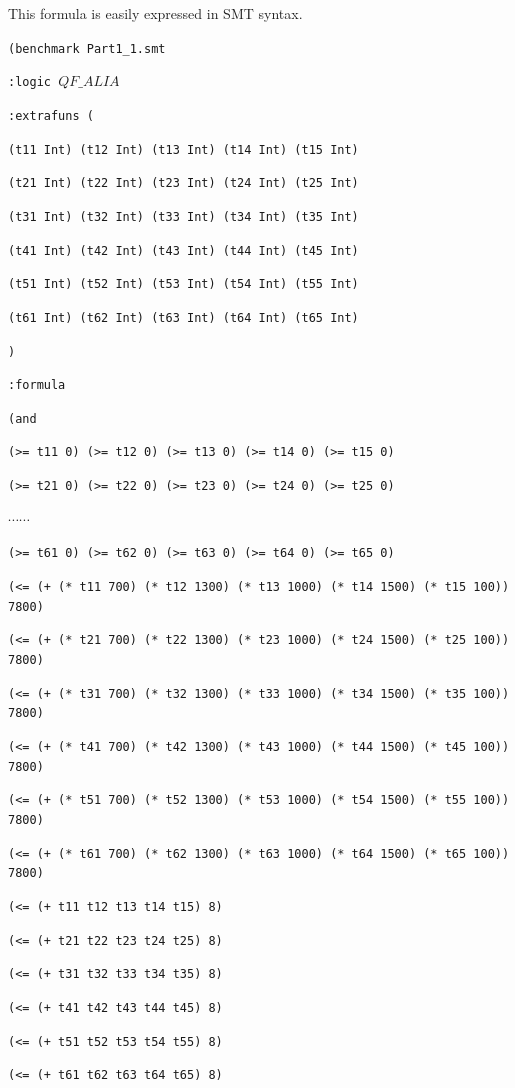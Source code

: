 \documentclass[11pt]{article}
\begin{document}
This formula is easily expressed in SMT syntax.

{\footnotesize

{\tt (benchmark Part1\_1.smt}

{\tt :logic $QF\_ALIA$}

{\tt :extrafuns (}

{\tt (t11 Int) (t12 Int) (t13 Int) (t14 Int) (t15 Int) }

{\tt (t21 Int) (t22 Int) (t23 Int) (t24 Int) (t25 Int) }

{\tt (t31 Int) (t32 Int) (t33 Int) (t34 Int) (t35 Int) }

{\tt (t41 Int) (t42 Int) (t43 Int) (t44 Int) (t45 Int) }

{\tt (t51 Int) (t52 Int) (t53 Int) (t54 Int) (t55 Int) }

{\tt (t61 Int) (t62 Int) (t63 Int) (t64 Int) (t65 Int) }

{\tt )}

{\tt :formula}

{\tt   (and}

{\tt (>= t11 0) (>= t12 0) (>= t13 0) (>= t14 0) (>= t15 0)}

{\tt (>= t21 0) (>= t22 0) (>= t23 0) (>= t24 0) (>= t25 0)}

$\cdots \cdots$

{\tt (>= t61 0) (>= t62 0) (>= t63 0) (>= t64 0) (>= t65 0) }

{\tt (<= (+ (* t11 700) (* t12 1300) (* t13 1000) (* t14 1500) (* t15 100)) 7800)}

{\tt (<= (+ (* t21 700) (* t22 1300) (* t23 1000) (* t24 1500) (* t25 100)) 7800)}

{\tt (<= (+ (* t31 700) (* t32 1300) (* t33 1000) (* t34 1500) (* t35 100)) 7800)}

{\tt (<= (+ (* t41 700) (* t42 1300) (* t43 1000) (* t44 1500) (* t45 100)) 7800)}

{\tt (<= (+ (* t51 700) (* t52 1300) (* t53 1000) (* t54 1500) (* t55 100)) 7800)}

{\tt (<= (+ (* t61 700) (* t62 1300) (* t63 1000) (* t64 1500) (* t65 100)) 7800) }

{\tt (<= (+ t11 t12 t13 t14 t15) 8)}

{\tt (<= (+ t21 t22 t23 t24 t25) 8)}

{\tt (<= (+ t31 t32 t33 t34 t35) 8)}

{\tt (<= (+ t41 t42 t43 t44 t45) 8)}

{\tt (<= (+ t51 t52 t53 t54 t55) 8)}

{\tt (<= (+ t61 t62 t63 t64 t65) 8)}

}
\end{document}
